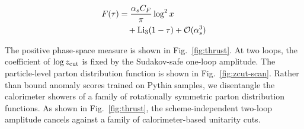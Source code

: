 \begin{align}
  F(\tau) &= \frac{\alpha_s C_F}{\pi} \log^2 x \nonumber \\
  &\quad + \mathrm{Li}_{3}(1 - \tau) + \mathcal{O}(\alpha_s^3) \label{eq:2}
\end{align}

The positive phase-space measure is shown in Fig.~\ref{fig:thrust}. At
two loops, the coefficient of $\log z_{\rm cut}$ is fixed by the
Sudakov-safe one-loop amplitude. The particle-level parton distribution
function is shown in Fig.~\ref{fig:zcut-scan}. Rather than bound anomaly
scores trained on Pythia samples, we disentangle the calorimeter showers
of a family of rotationally symmetric parton distribution functions. As
shown in Fig.~\ref{fig:thrust}, the scheme-independent two-loop
amplitude cancels against a family of calorimeter-based unitarity cuts.

